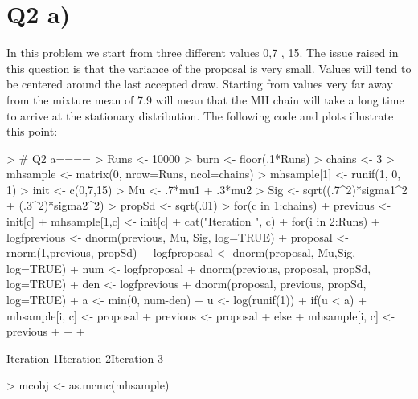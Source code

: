 \documentclass{article}
\begin{document}
\section*{Q2 a)}
In this problem we start from three different values 0,7 , 15. The issue raised in this question is that the variance of the proposal is very small. Values will tend to be centered around the last accepted draw. Starting from values very far away from the mixture mean of 7.9 will mean that the MH chain will take a long time to arrive at the stationary distribution. The following code and plots illustrate this point:
\begin{Schunk}
\begin{Sinput}
> # Q2 a====  
> Runs <- 10000
> burn <- floor(.1*Runs)
> chains <- 3
> mhsample <- matrix(0, nrow=Runs, ncol=chains)
> mhsample[1] <- runif(1, 0, 1)
> init <- c(0,7,15)
> Mu <- .7*mu1 + .3*mu2
> Sig <- sqrt((.7^2)*sigma1^2 + (.3^2)*sigma2^2)
> propSd <- sqrt(.01)
> for(c in 1:chains){
+   previous <- init[c]
+   mhsample[1,c] <- init[c]
+   cat("Iteration ", c)
+   for(i in 2:Runs){
+     logfprevious <- dnorm(previous, Mu, Sig, log=TRUE)
+     proposal <- rnorm(1,previous, propSd)
+     logfproposal <- dnorm(proposal, Mu,Sig, log=TRUE)
+     num <-  logfproposal + dnorm(previous, proposal, propSd, log=TRUE)
+     den <- logfprevious + dnorm(proposal, previous, propSd, log=TRUE)
+     a <- min(0, num-den)
+     u <- log(runif(1))
+     if(u < a){
+       mhsample[i, c] <- proposal  
+       previous <- proposal
+     }else{
+       mhsample[i, c] <- previous
+     }
+   }
+ }
\end{Sinput}
\begin{Soutput}
Iteration  1Iteration  2Iteration  3
\end{Soutput}
\begin{Sinput}
> mcobj <- as.mcmc(mhsample)
\end{Sinput}
\end{Schunk}
\end{document}
